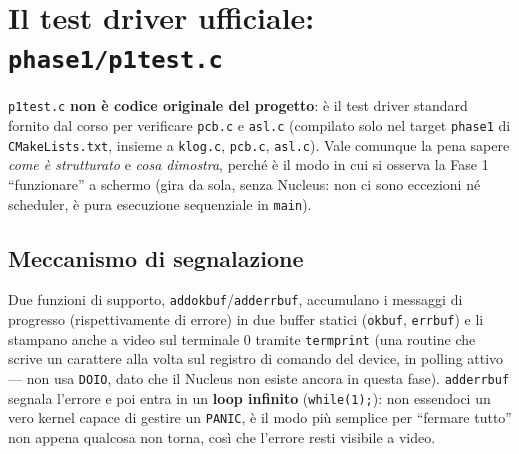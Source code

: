 \documentclass[11pt,a4paper]{article}
\newcommand{\code}[1]{\texttt{#1}}
\begin{document}
\section{Il test driver ufficiale: \code{phase1/p1test.c}}

\code{p1test.c} \textbf{non è codice originale del progetto}: è il test
driver standard fornito dal corso per verificare \code{pcb.c} e
\code{asl.c} (compilato solo nel target \code{phase1} di
\code{CMakeLists.txt}, insieme a \code{klog.c}, \code{pcb.c},
\code{asl.c}). Vale comunque la pena sapere \emph{come è strutturato} e
\emph{cosa dimostra}, perché è il modo in cui si osserva la Fase 1
``funzionare'' a schermo (gira da sola, senza Nucleus: non ci sono
eccezioni né scheduler, è pura esecuzione sequenziale in \code{main}).

\subsection{Meccanismo di segnalazione}
Due funzioni di supporto, \code{addokbuf}/\code{adderrbuf}, accumulano i
messaggi di progresso (rispettivamente di errore) in due buffer statici
(\code{okbuf}, \code{errbuf}) e li stampano anche a video sul terminale 0
tramite \code{termprint} (una routine che scrive un carattere alla volta
sul registro di comando del device, in polling attivo --- non usa
\code{DOIO}, dato che il Nucleus non esiste ancora in questa fase).
\code{adderrbuf} segnala l'errore e poi entra in un \textbf{loop infinito}
(\code{while(1);}): non essendoci un vero kernel capace di gestire un
\code{PANIC}, è il modo più semplice per ``fermare tutto'' non appena
qualcosa non torna, così che l'errore resti visibile a video.
\end{document}
